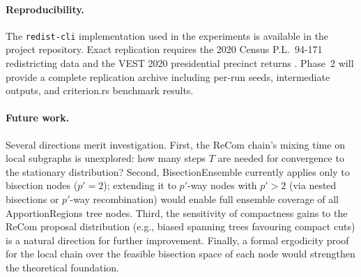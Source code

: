 \paragraph{Reproducibility.}
The \texttt{redist-cli} implementation used in the experiments is available
in the project repository. Exact replication requires the 2020 Census
P.L.~94-171 redistricting data and the VEST 2020 presidential precinct returns
\citep{vest2020}. Phase~2 will provide a complete replication archive including
per-run seeds, intermediate outputs, and criterion.rs benchmark results.

\paragraph{Future work.}
Several directions merit investigation. First, the ReCom chain's mixing time
on local subgraphs is unexplored: how many steps $T$ are needed for convergence
to the stationary distribution? Second, BisectionEnsemble currently applies only
to bisection nodes ($p' = 2$); extending it to $p'$-way nodes with $p' > 2$
(via nested bisections or $p'$-way recombination) would enable full ensemble
coverage of all ApportionRegions tree nodes. Third, the sensitivity of compactness
gains to the ReCom proposal distribution (e.g., biased spanning trees favouring
compact cuts) is a natural direction for further improvement. Finally, a formal
ergodicity proof for the local chain over the feasible bisection space of each
node would strengthen the theoretical foundation.
